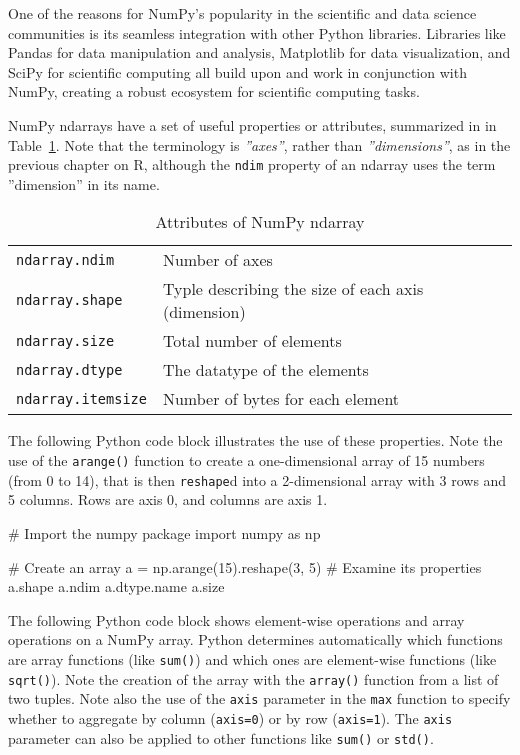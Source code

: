 One of the reasons for NumPy's popularity in the scientific and data science communities is its seamless integration with other Python libraries. Libraries like Pandas for data manipulation and analysis, Matplotlib for data visualization, and SciPy for scientific computing all build upon and work in conjunction with NumPy, creating a robust ecosystem for scientific computing tasks.

NumPy ndarrays have a set of useful properties or attributes, summarized in in Table~\ref{tab:numpydatatypes}. Note that the terminology is \emph{''axes''}, rather than \emph{''dimensions''}, as in the previous chapter on R, although the \texttt{ndim} property of an ndarray uses the term ''dimension'' in its name.

\begin{table}
\centering
\renewcommand{\arraystretch}{1.25}
\begin{tabularx}{\linewidth}{l|X} \hline
\texttt{ndarray.ndim} & Number of axes \\
\texttt{ndarray.shape} & Typle describing the size of each axis (dimension)\index{Shape (of array)} \\
\texttt{ndarray.size} & Total number of elements \\
\texttt{ndarray.dtype} & The datatype of the elements \\
\texttt{ndarray.itemsize} & Number of bytes for each element \\ \hline
\end{tabularx}
\caption{Attributes of NumPy ndarray}
\label{tab:numpydatatypes}
\end{table}

The following Python code block illustrates the use of these properties. Note the use of the \texttt{arange()} function to create a one-dimensional array of 15 numbers (from 0 to 14), that is then \texttt{reshape}d into a 2-dimensional array with 3 rows and 5 columns. Rows are axis 0, and columns are axis 1.

\begin{samepage}
\begin{pythoncode}
# Import the numpy package
import numpy as np

# Create an array
a = np.arange(15).reshape(3, 5)
# Examine its properties
a.shape
a.ndim
a.dtype.name
a.size
\end{pythoncode}
\end{samepage}

The following Python code block shows element-wise operations and array operations on a NumPy array. Python determines automatically which functions are array functions (like \texttt{sum()}) and which ones are element-wise functions (like \texttt{sqrt()}). Note the creation of the array with the \texttt{array()} function from a list of two tuples. Note also the use of the \texttt{axis} parameter in the \texttt{max} function to specify whether to aggregate by column (\texttt{axis=0}) or by row (\texttt{axis=1}). The \texttt{axis} parameter can also be applied to other functions like \texttt{sum()} or \texttt{std()}.

